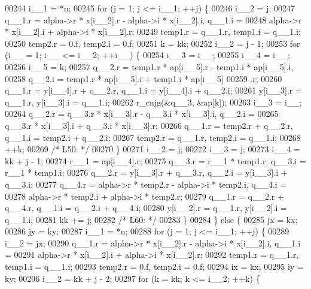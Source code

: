 \begin{DoxyCode}
00244         i\_\_1 = *n;
00245         \textcolor{keywordflow}{for} (j = 1; j <= i\_\_1; ++j) \{
00246         i\_\_2 = j;
00247         q\_\_1.r = alpha->r * x[i\_\_2].r - alpha->i * x[i\_\_2].i, q\_\_1.i =
00248              alpha->r * x[i\_\_2].i + alpha->i * x[i\_\_2].r;
00249         temp1.r = q\_\_1.r, temp1.i = q\_\_1.i;
00250         temp2.r = 0.f, temp2.i = 0.f;
00251         k = kk;
00252         i\_\_2 = j - 1;
00253         \textcolor{keywordflow}{for} (i\_\_ = 1; i\_\_ <= i\_\_2; ++i\_\_) \{
00254             i\_\_3 = i\_\_;
00255             i\_\_4 = i\_\_;
00256             i\_\_5 = k;
00257             q\_\_2.r = temp1.r * ap[i\_\_5].r - temp1.i * ap[i\_\_5].i, 
00258                 q\_\_2.i = temp1.r * ap[i\_\_5].i + temp1.i * ap[i\_\_5]
00259                 .r;
00260             q\_\_1.r = y[i\_\_4].r + q\_\_2.r, q\_\_1.i = y[i\_\_4].i + q\_\_2.i;
00261             y[i\_\_3].r = q\_\_1.r, y[i\_\_3].i = q\_\_1.i;
00262             r\_cnjg(&q\_\_3, &ap[k]);
00263             i\_\_3 = i\_\_;
00264             q\_\_2.r = q\_\_3.r * x[i\_\_3].r - q\_\_3.i * x[i\_\_3].i, q\_\_2.i =
00265                  q\_\_3.r * x[i\_\_3].i + q\_\_3.i * x[i\_\_3].r;
00266             q\_\_1.r = temp2.r + q\_\_2.r, q\_\_1.i = temp2.i + q\_\_2.i;
00267             temp2.r = q\_\_1.r, temp2.i = q\_\_1.i;
00268             ++k;
00269 \textcolor{comment}{/* L50: */}
00270         \}
00271         i\_\_2 = j;
00272         i\_\_3 = j;
00273         i\_\_4 = kk + j - 1;
00274         r\_\_1 = ap[i\_\_4].r;
00275         q\_\_3.r = r\_\_1 * temp1.r, q\_\_3.i = r\_\_1 * temp1.i;
00276         q\_\_2.r = y[i\_\_3].r + q\_\_3.r, q\_\_2.i = y[i\_\_3].i + q\_\_3.i;
00277         q\_\_4.r = alpha->r * temp2.r - alpha->i * temp2.i, q\_\_4.i = 
00278             alpha->r * temp2.i + alpha->i * temp2.r;
00279         q\_\_1.r = q\_\_2.r + q\_\_4.r, q\_\_1.i = q\_\_2.i + q\_\_4.i;
00280         y[i\_\_2].r = q\_\_1.r, y[i\_\_2].i = q\_\_1.i;
00281         kk += j;
00282 \textcolor{comment}{/* L60: */}
00283         \}
00284     \} \textcolor{keywordflow}{else} \{
00285         jx = kx;
00286         jy = ky;
00287         i\_\_1 = *n;
00288         \textcolor{keywordflow}{for} (j = 1; j <= i\_\_1; ++j) \{
00289         i\_\_2 = jx;
00290         q\_\_1.r = alpha->r * x[i\_\_2].r - alpha->i * x[i\_\_2].i, q\_\_1.i =
00291              alpha->r * x[i\_\_2].i + alpha->i * x[i\_\_2].r;
00292         temp1.r = q\_\_1.r, temp1.i = q\_\_1.i;
00293         temp2.r = 0.f, temp2.i = 0.f;
00294         ix = kx;
00295         iy = ky;
00296         i\_\_2 = kk + j - 2;
00297         \textcolor{keywordflow}{for} (k = kk; k <= i\_\_2; ++k) \{

\end{DoxyCode}
